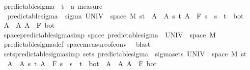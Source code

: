 \begin{isabellebody}
\isanewline
\isanewline
{}\isamarkupfalse%
\ predictable{\isacharunderscore}{\kern0pt}sigma\ {\isacharcolon}{\kern0pt}{\isacharcolon}{\kern0pt}\ {\isachardoublequoteopen}{\isacharparenleft}{\kern0pt}{\isacharprime}{\kern0pt}t\ {\isasymtimes}\ {\isacharprime}{\kern0pt}a{\isacharparenright}{\kern0pt}\ measure{\isachardoublequoteclose}\ \isanewline
\ \ {\isachardoublequoteopen}predictable{\isacharunderscore}{\kern0pt}sigma\ {\isacharequal}{\kern0pt}\ sigma\ {\isacharparenleft}{\kern0pt}UNIV\ {\isasymtimes}\ space\ M{\isacharparenright}{\kern0pt}\ {\isacharparenleft}{\kern0pt}{\isacharbraceleft}{\kern0pt}{\isacharbraceleft}{\kern0pt}s{\isacharless}{\kern0pt}{\isachardot}{\kern0pt}{\isachardot}{\kern0pt}t{\isacharbraceright}{\kern0pt}\ {\isasymtimes}\ A\ {\isacharbar}{\kern0pt}\ A\ s\ t{\isachardot}{\kern0pt}\ A\ {\isasymin}\ F\ s\ {\isasymand}\ s\ {\isacharless}{\kern0pt}\ t{\isacharbraceright}{\kern0pt}\ {\isasymunion}\ {\isacharbraceleft}{\kern0pt}{\isacharbraceleft}{\kern0pt}bot{\isacharbraceright}{\kern0pt}\ {\isasymtimes}\ A\ {\isacharbar}{\kern0pt}\ A{\isachardot}{\kern0pt}\ A\ {\isasymin}\ F\ bot{\isacharbraceright}{\kern0pt}{\isacharparenright}{\kern0pt}{\isachardoublequoteclose}\isanewline
\isanewline
{}\isamarkupfalse%
\ space{\isacharunderscore}{\kern0pt}predictable{\isacharunderscore}{\kern0pt}sigma{\isacharbrackleft}{\kern0pt}simp{\isacharbrackright}{\kern0pt}{\isacharcolon}{\kern0pt}\ {\isachardoublequoteopen}space\ predictable{\isacharunderscore}{\kern0pt}sigma\ {\isacharequal}{\kern0pt}\ {\isacharparenleft}{\kern0pt}UNIV\ {\isasymtimes}\ space\ M{\isacharparenright}{\kern0pt}{\isachardoublequoteclose}%
\isadelimproof
\ %
\endisadelimproof
%
\isatagproof
{}\isamarkupfalse%
\ predictable{\isacharunderscore}{\kern0pt}sigma{\isacharunderscore}{\kern0pt}def\ space{\isacharunderscore}{\kern0pt}measure{\isacharunderscore}{\kern0pt}of{\isacharunderscore}{\kern0pt}conv\ \isamarkupfalse%
\ blast%
\endisatagproof
{\isafoldproof}%
%
\isadelimproof
%
\endisadelimproof
\isanewline
\isanewline
{}\isamarkupfalse%
\ sets{\isacharunderscore}{\kern0pt}predictable{\isacharunderscore}{\kern0pt}sigma{\isacharbrackleft}{\kern0pt}simp{\isacharbrackright}{\kern0pt}{\isacharcolon}{\kern0pt}\ {\isachardoublequoteopen}sets\ predictable{\isacharunderscore}{\kern0pt}sigma\ {\isacharequal}{\kern0pt}\ sigma{\isacharunderscore}{\kern0pt}sets\ {\isacharparenleft}{\kern0pt}UNIV\ {\isasymtimes}\ space\ M{\isacharparenright}{\kern0pt}\ {\isacharparenleft}{\kern0pt}{\isacharbraceleft}{\kern0pt}{\isacharbraceleft}{\kern0pt}s{\isacharless}{\kern0pt}{\isachardot}{\kern0pt}{\isachardot}{\kern0pt}t{\isacharbraceright}{\kern0pt}\ {\isasymtimes}\ A\ {\isacharbar}{\kern0pt}\ A\ s\ t{\isachardot}{\kern0pt}\ A\ {\isasymin}\ F\ s\ {\isasymand}\ s\ {\isacharless}{\kern0pt}\ t{\isacharbraceright}{\kern0pt}\ {\isasymunion}\ {\isacharbraceleft}{\kern0pt}{\isacharbraceleft}{\kern0pt}bot{\isacharbraceright}{\kern0pt}\ {\isasymtimes}\ A\ {\isacharbar}{\kern0pt}\ A{\isachardot}{\kern0pt}\ A\ {\isasymin}\ F\ bot{\isacharbraceright}{\kern0pt}{\isacharparenright}{\kern0pt}{\isachardoublequoteclose}\ \isanewline

\end{isabellebody}
